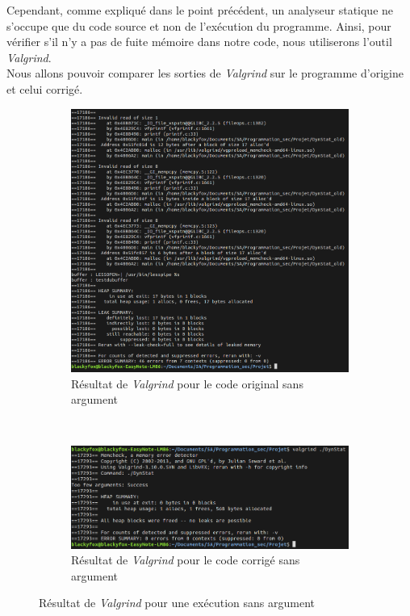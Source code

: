 Cependant, comme expliqué dans le point précédent, un analyseur statique ne s'occupe que du code source et non de l'exécution du programme. Ainsi, pour vérifier s'il n'y a pas de fuite mémoire dans notre code, nous utiliserons l'outil \textit{Valgrind}.\\
Nous allons pouvoir comparer les sorties de \textit{Valgrind} sur le programme d'origine et celui corrigé.
\begin{figure}[H]
  \begin{subfigure}[b]{0.45\textwidth}
    \includegraphics[width=\textwidth]{img/conc3.png}
    \caption{Résultat de \textit{Valgrind} pour le code original sans argument}
  \end{subfigure}
  ~
  \begin{subfigure}[b]{0.45\textwidth}
    \includegraphics[width=\textwidth]{img/conc4.png}
    \caption{Résultat de \textit{Valgrind} pour le code corrigé sans argument}
  \end{subfigure}
  \caption{Résultat de \textit{Valgrind} pour une exécution sans argument}
\end{figure}

